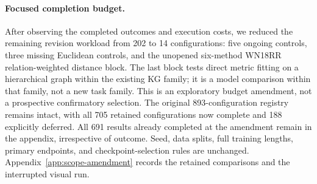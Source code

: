 



\paragraph{Focused completion budget.}
After observing the completed outcomes and execution costs, we reduced the remaining revision workload from 202 to 14 configurations: five ongoing controls, three missing Euclidean controls, and the unopened six-method WN18RR relation-weighted distance block. The last block tests direct metric fitting on a hierarchical graph within the existing KG family; it is a model comparison within that family, not a new task family. This is an exploratory budget amendment, not a prospective confirmatory selection. The original 893-configuration registry remains intact, with all 705 retained configurations now complete and 188 explicitly deferred. All 691 results already completed at the amendment remain in the appendix, irrespective of outcome. Seed, data splits, full training lengths, primary endpoints, and checkpoint-selection rules are unchanged. Appendix~\ref{app:scope-amendment} records the retained comparisons and the interrupted visual run.
